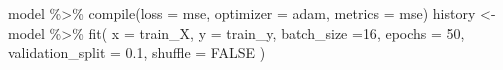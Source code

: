 \documentclass[
]{article}
\newenvironment{Shaded}{\begin{snugshade}}{\end{snugshade}}
\newcommand{\AttributeTok}[1]{\textcolor[rgb]{0.77,0.63,0.00}{#1}}
\newcommand{\ConstantTok}[1]{\textcolor[rgb]{0.00,0.00,0.00}{#1}}
\newcommand{\DecValTok}[1]{\textcolor[rgb]{0.00,0.00,0.81}{#1}}
\newcommand{\FloatTok}[1]{\textcolor[rgb]{0.00,0.00,0.81}{#1}}
\newcommand{\FunctionTok}[1]{\textcolor[rgb]{0.00,0.00,0.00}{#1}}
\newcommand{\NormalTok}[1]{#1}
\newcommand{\OtherTok}[1]{\textcolor[rgb]{0.56,0.35,0.01}{#1}}
\newcommand{\SpecialCharTok}[1]{\textcolor[rgb]{0.00,0.00,0.00}{#1}}
\newcommand{\StringTok}[1]{\textcolor[rgb]{0.31,0.60,0.02}{#1}}
\begin{document}
\begin{Shaded}
\begin{Highlighting}[]
\NormalTok{model }\SpecialCharTok{\%\textgreater{}\%} \FunctionTok{compile}\NormalTok{(}\AttributeTok{loss =} \StringTok{\textquotesingle{}mse\textquotesingle{}}\NormalTok{,}
                  \AttributeTok{optimizer =} \StringTok{\textquotesingle{}adam\textquotesingle{}}\NormalTok{,}
                  \AttributeTok{metrics =} \StringTok{\textquotesingle{}mse\textquotesingle{}}\NormalTok{)}
\NormalTok{history }\OtherTok{\textless{}{-}}\NormalTok{ model }\SpecialCharTok{\%\textgreater{}\%} \FunctionTok{fit}\NormalTok{(}
  \AttributeTok{x =}\NormalTok{ train\_X,}
  \AttributeTok{y =}\NormalTok{ train\_y,}
  \AttributeTok{batch\_size =}\DecValTok{16}\NormalTok{,}
  \AttributeTok{epochs =} \DecValTok{50}\NormalTok{,}
  \AttributeTok{validation\_split =} \FloatTok{0.1}\NormalTok{,}
  \AttributeTok{shuffle =} \ConstantTok{FALSE}
\NormalTok{)}
\end{Highlighting}
\end{Shaded}
\end{document}
